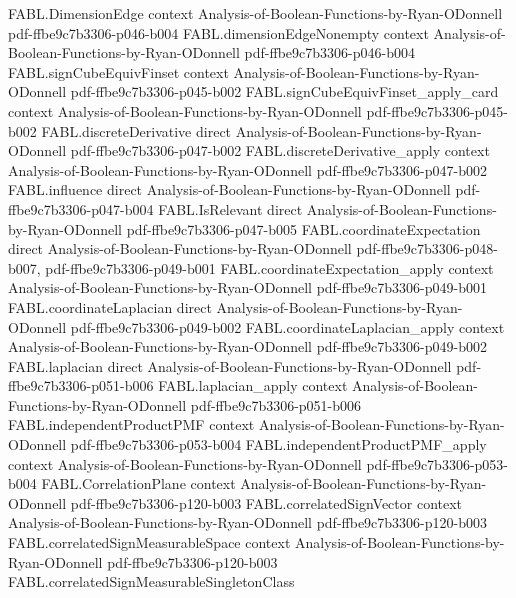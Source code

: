 \begin{theorem}
\proofstep
  {FABL.DimensionEdge}
  {context}
  {Analysis-of-Boolean-Functions-by-Ryan-ODonnell}
  {pdf-ffbe9c7b3306-p046-b004}
\proofstep
  {FABL.dimensionEdgeNonempty}
  {context}
  {Analysis-of-Boolean-Functions-by-Ryan-ODonnell}
  {pdf-ffbe9c7b3306-p046-b004}
\proofstep
  {FABL.signCubeEquivFinset}
  {context}
  {Analysis-of-Boolean-Functions-by-Ryan-ODonnell}
  {pdf-ffbe9c7b3306-p045-b002}
\proofstep
  {FABL.signCubeEquivFinset_apply_card}
  {context}
  {Analysis-of-Boolean-Functions-by-Ryan-ODonnell}
  {pdf-ffbe9c7b3306-p045-b002}
\proofstep
  {FABL.discreteDerivative}
  {direct}
  {Analysis-of-Boolean-Functions-by-Ryan-ODonnell}
  {pdf-ffbe9c7b3306-p047-b002}
\proofstep
  {FABL.discreteDerivative_apply}
  {context}
  {Analysis-of-Boolean-Functions-by-Ryan-ODonnell}
  {pdf-ffbe9c7b3306-p047-b002}
\proofstep
  {FABL.influence}
  {direct}
  {Analysis-of-Boolean-Functions-by-Ryan-ODonnell}
  {pdf-ffbe9c7b3306-p047-b004}
\proofstep
  {FABL.IsRelevant}
  {direct}
  {Analysis-of-Boolean-Functions-by-Ryan-ODonnell}
  {pdf-ffbe9c7b3306-p047-b005}
\proofstep
  {FABL.coordinateExpectation}
  {direct}
  {Analysis-of-Boolean-Functions-by-Ryan-ODonnell}
  {pdf-ffbe9c7b3306-p048-b007,
    pdf-ffbe9c7b3306-p049-b001}
\proofstep
  {FABL.coordinateExpectation_apply}
  {context}
  {Analysis-of-Boolean-Functions-by-Ryan-ODonnell}
  {pdf-ffbe9c7b3306-p049-b001}
\proofstep
  {FABL.coordinateLaplacian}
  {direct}
  {Analysis-of-Boolean-Functions-by-Ryan-ODonnell}
  {pdf-ffbe9c7b3306-p049-b002}
\proofstep
  {FABL.coordinateLaplacian_apply}
  {context}
  {Analysis-of-Boolean-Functions-by-Ryan-ODonnell}
  {pdf-ffbe9c7b3306-p049-b002}
\proofstep
  {FABL.laplacian}
  {direct}
  {Analysis-of-Boolean-Functions-by-Ryan-ODonnell}
  {pdf-ffbe9c7b3306-p051-b006}
\proofstep
  {FABL.laplacian_apply}
  {context}
  {Analysis-of-Boolean-Functions-by-Ryan-ODonnell}
  {pdf-ffbe9c7b3306-p051-b006}
\proofstep
  {FABL.independentProductPMF}
  {context}
  {Analysis-of-Boolean-Functions-by-Ryan-ODonnell}
  {pdf-ffbe9c7b3306-p053-b004}
\proofstep
  {FABL.independentProductPMF_apply}
  {context}
  {Analysis-of-Boolean-Functions-by-Ryan-ODonnell}
  {pdf-ffbe9c7b3306-p053-b004}
\proofstep
  {FABL.CorrelationPlane}
  {context}
  {Analysis-of-Boolean-Functions-by-Ryan-ODonnell}
  {pdf-ffbe9c7b3306-p120-b003}
\proofstep
  {FABL.correlatedSignVector}
  {context}
  {Analysis-of-Boolean-Functions-by-Ryan-ODonnell}
  {pdf-ffbe9c7b3306-p120-b003}
\proofstep
  {FABL.correlatedSignMeasurableSpace}
  {context}
  {Analysis-of-Boolean-Functions-by-Ryan-ODonnell}
  {pdf-ffbe9c7b3306-p120-b003}
\proofstep
  {FABL.correlatedSignMeasurableSingletonClass}

\end{theorem}
